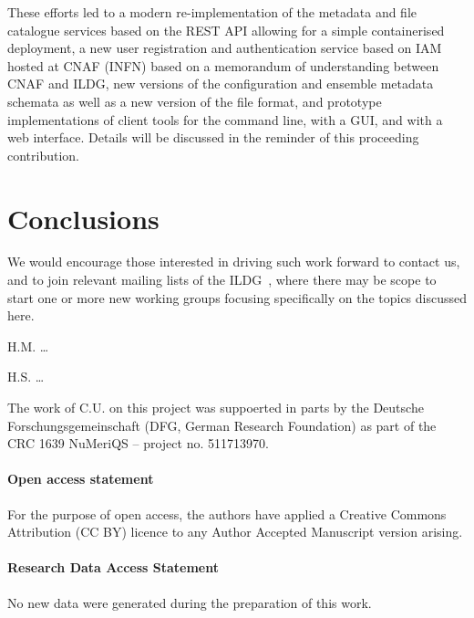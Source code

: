 \documentclass[a4paper,11pt]{article} \usepackage{pos} \usepackage{subcaption}
\begin{document}
These efforts led to a modern re-implementation of the metadata and
file catalogue services based on the REST API allowing for a simple
containerised deployment, a new user registration and authentication
service based on IAM hosted at CNAF (INFN) based on a memorandum of
understanding between CNAF and ILDG, new versions of the configuration
and ensemble metadata schemata as well as a new version of the file
format, and prototype implementations of client tools for the command
line, with a GUI, and with a web interface. Details will be discussed
in the reminder of this proceeding contribution.



\section{Conclusions}


We would encourage those interested in driving such work forward
to contact us,
and to join relevant mailing lists of the ILDG~\cite{ildg-organization},
where there may be scope to start one or more new working groups
focusing specifically on the topics discussed here.


\acknowledgments

H.M. \dots

H.S. \dots

The work of C.U. on this project was suppoerted in parts by the
Deutsche Forschungsgemeinschaft (DFG, German Research Foundation) as
part of the CRC 1639 NuMeriQS – project no. 511713970. 


\paragraph*{Open access statement}
For the purpose of open access, the authors have applied a Creative Commons
Attribution (CC BY) licence to any Author Accepted Manuscript version arising.

\paragraph*{Research Data Access Statement}
No new data were generated during the preparation of this work.



\end{document}
